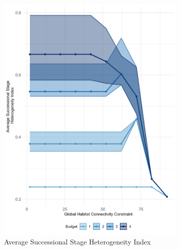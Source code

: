 \begin{figure}
\begin{subfigure}[b]{.48\textwidth}
        \includegraphics[height = .3\textheight]{figures/wildland/average_het.jpg}
        \caption{Average Successional Stage Heterogeneity Index}
        \label{fig:het}
    \end{subfigure}
       \vspace{1em} %
    \begin{subfigure}[b]{.48\textwidth}
        \centering

\end{subfigure}
\end{figure}
